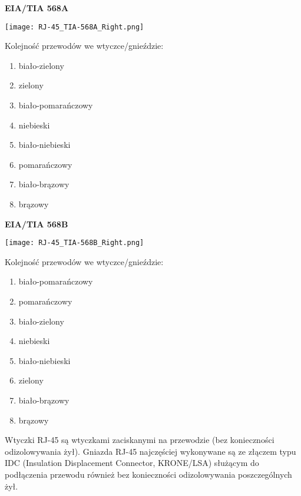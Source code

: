 \documentclass{pdfBooklets}
\begin{document}
\vspace{0.3cm}\noindent
\begin{minipage}{0.47\textwidth}
\begin{center}
{\noindent\large\bfseries EIA/TIA 568A}

{\noindent\texttt{[image: RJ-45\_TIA-568A\_Right.png]}}
\end{center}
\vspace{-0.3cm}

Kolejność przewodów we wtyczce/gnieździe:
\begin{enumerate}
	\item biało-zielony
	\item zielony
	\item biało-pomarańczowy
	\item niebieski
	\item biało-niebieski
	\item pomarańczowy
	\item biało-brązowy
	\item brązowy
\end{enumerate}
\end{minipage}
\hfill
\begin{minipage}{0.47\textwidth}
\begin{center}
{\noindent\large\bfseries EIA/TIA 568B}

{\noindent\texttt{[image: RJ-45\_TIA-568B\_Right.png]}}
\end{center}
\vspace{-0.3cm}

Kolejność przewodów we wtyczce/gnieździe:
\begin{enumerate}
	\item biało-pomarańczowy
	\item pomarańczowy
	\item biało-zielony
	\item niebieski
	\item biało-niebieski
	\item zielony
	\item biało-brązowy
	\item brązowy
\end{enumerate}
\end{minipage}
\vspace{0.3cm}

Wtyczki RJ-45 są wtyczkami zaciskanymi na przewodzie (bez konieczności odizolowywania żył). Gniazda RJ-45 najczęściej wykonywane są ze złączem typu IDC (Insulation Displacement Connector, KRONE/LSA) służącym do podłączenia przewodu również bez konieczności odizolowywania poszczególnych żył.
\end{document}
